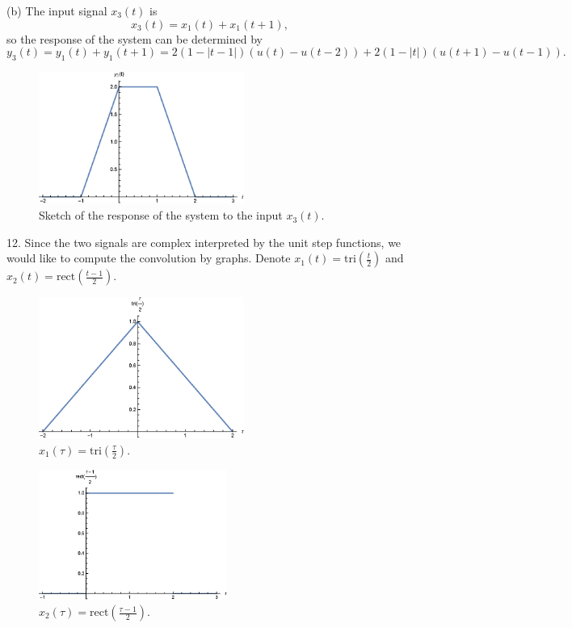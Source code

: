 \documentclass[a4paper]{article}
\begin{document}
(b) The input signal $x_3(t)$ is
$$x_3(t)=x_1(t)+x_1(t+1),$$
so the response of the system can be determined by
$$y_3(t)=y_1(t)+y_1(t+1)=2(1-|t-1|)(u(t)-u(t-2))+2(1-|t|)(u(t+1)-u(t-1)).$$
\begin{figure}[H]
    \begin{center}
        \includegraphics[width=0.6\textwidth]{11(b).eps}
    \end{center}
    \caption{Sketch of the response of the system to the input $x_3(t)$.}
\end{figure}
12. Since the two signals are complex interpreted by the unit step functions, we would like to compute the convolution by graphs. Denote $x_1(t)=\mathrm{tri}(\frac{t}{2})$ and $x_2(t)=\mathrm{rect}(\frac{t-1}{2})$.
\begin{figure}[H]
    \begin{center}
        \includegraphics[width=0.6\textwidth]{12-1.eps}
    \end{center}
    \caption{$x_1(\tau)=\mathrm{tri}(\frac{\tau}{2})$.}
\end{figure}
\begin{figure}[H]
    \begin{center}
        \includegraphics[width=0.55\textwidth]{12-2.eps}
    \end{center}
    \caption{$x_2(\tau)=\mathrm{rect}(\frac{\tau-1}{2})$.}
\end{figure}
\end{document}
